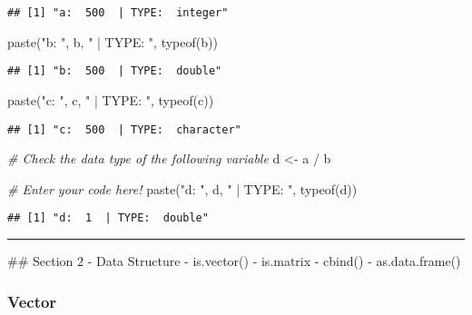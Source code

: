 \documentclass[
]{article}
\newenvironment{Shaded}{\begin{snugshade}}{\end{snugshade}}
\newcommand{\CommentTok}[1]{\textcolor[rgb]{0.56,0.35,0.01}{\textit{#1}}}
\newcommand{\FunctionTok}[1]{\textcolor[rgb]{0.00,0.00,0.00}{#1}}
\newcommand{\NormalTok}[1]{#1}
\newcommand{\OtherTok}[1]{\textcolor[rgb]{0.56,0.35,0.01}{#1}}
\newcommand{\SpecialCharTok}[1]{\textcolor[rgb]{0.00,0.00,0.00}{#1}}
\newcommand{\StringTok}[1]{\textcolor[rgb]{0.31,0.60,0.02}{#1}}
\begin{document}
\begin{verbatim}
## [1] "a:  500  | TYPE:  integer"
\end{verbatim}

\begin{Shaded}
\begin{Highlighting}[]
\FunctionTok{paste}\NormalTok{(}\StringTok{"b: "}\NormalTok{, b, }\StringTok{" | TYPE: "}\NormalTok{, }\FunctionTok{typeof}\NormalTok{(b))}
\end{Highlighting}
\end{Shaded}

\begin{verbatim}
## [1] "b:  500  | TYPE:  double"
\end{verbatim}

\begin{Shaded}
\begin{Highlighting}[]
\FunctionTok{paste}\NormalTok{(}\StringTok{"c: "}\NormalTok{, c, }\StringTok{" | TYPE: "}\NormalTok{, }\FunctionTok{typeof}\NormalTok{(c))}
\end{Highlighting}
\end{Shaded}

\begin{verbatim}
## [1] "c:  500  | TYPE:  character"
\end{verbatim}

\begin{Shaded}
\begin{Highlighting}[]
\CommentTok{\# Check the data type of the following variable}
\NormalTok{d }\OtherTok{\textless{}{-}}\NormalTok{ a }\SpecialCharTok{/}\NormalTok{ b}

\CommentTok{\# Enter your code here!}
\FunctionTok{paste}\NormalTok{(}\StringTok{"d: "}\NormalTok{, d, }\StringTok{" | TYPE: "}\NormalTok{, }\FunctionTok{typeof}\NormalTok{(d))}
\end{Highlighting}
\end{Shaded}

\begin{verbatim}
## [1] "d:  1  | TYPE:  double"
\end{verbatim}

\begin{center}\rule{0.5\linewidth}{0.5pt}\end{center}

\#\# Section 2 - Data Structure - is.vector() - is.matrix - cbind() -
as.data.frame()

\hypertarget{vector}{%
\subsubsection{Vector}\label{vector}}
\end{document}
